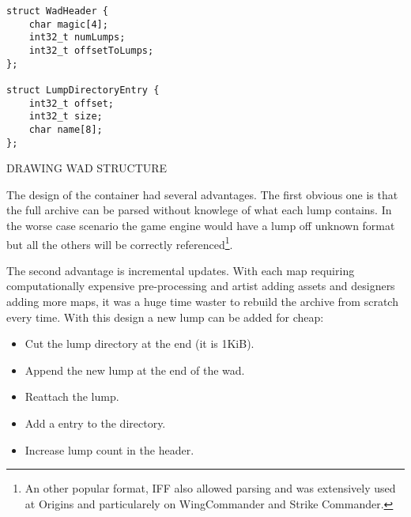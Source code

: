 \begin{verbatim}
struct WadHeader {
    char magic[4];
    int32_t numLumps;
    int32_t offsetToLumps;
};

struct LumpDirectoryEntry {
    int32_t offset;
    int32_t size;
    char name[8];
};
\end{verbatim}
\par
DRAWING WAD STRUCTURE\\
\par
The design of the container had several advantages. The first obvious one is that the full archive can be parsed without knowlege of what each lump contains. In the worse case scenario the game engine would have a lump off unknown format but all the others will be correctly referenced\footnote{An other popular format, IFF also allowed parsing and was extensively used at Origins and particularely on WingCommander and Strike Commander.}.\\
\par
 The second advantage is incremental updates. With each map requiring computationally expensive pre-processing and artist adding assets and designers adding more maps, it was a huge time waster to rebuild the archive from scratch every time. With this design a new lump can be added for cheap:
\begin{itemize}
 \item Cut the lump directory at the end (it is 1KiB).
 \item Append the new lump at the end of the wad.
 \item Reattach the lump.
 \item Add a entry to the directory.
 \item Increase lump count in the header.
\end{itemize}

